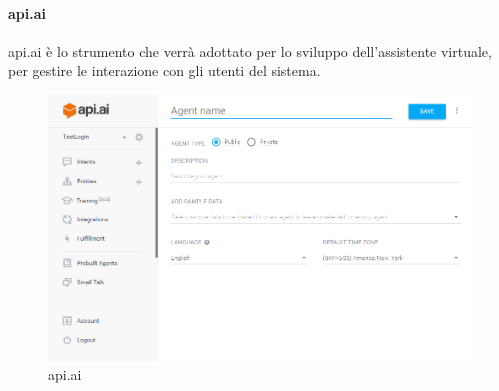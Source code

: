 \paragraph{api.ai}
api.ai è lo strumento che verrà adottato per lo sviluppo dell'assistente virtuale, per gestire le interazione con gli utenti del sistema.
\begin{figure}[h]
\centering
\includegraphics[scale=0.5]{img/api_ai.png}
\caption{api.ai}\label{sec:Figura1}
\end{figure}

\newpage
